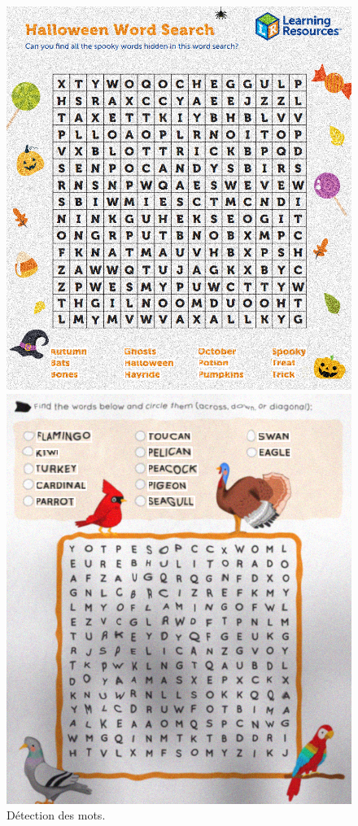 \documentclass{article}
\begin{document}
\begin{figure}[H]
  \centering
      \includegraphics[width=\linewidth]{ressources/image_2_word_detection_10_detected_words.png}
      \caption{}
    \endminipage\quad\quad\quad\quad
    \includegraphics[width=\linewidth]{ressources/image_3_word_detection_10_detected_words.png}
    \caption{}
  \endminipage
  \caption{Détection des mots.}
\end{figure}
\end{document}
